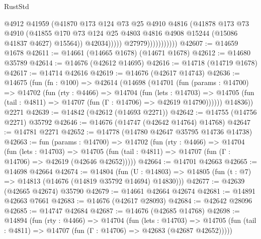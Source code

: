 \begin{lexlean}{RustStd}
\begin{coremodule}
                                  @4912
                                  @41959
                                  (@41870
                                    @173
                                    @124
                                    @73
                                    @25
                                    @4910
                                    @4816
                                    (@41878
                                      @173
                                      @73
                                      @4910
                                      (@41855
                                        @170
                                        @73
                                        @124
                                        @25
                                        @4803
                                        @4816
                                        @4908
                                        @15244
                                        (@15086 @41837 @4627)
                                        @15564))
                                    @42034)))))
                          @27979)))))))))))
@42607 := @14659 @1678
@42611 := @14661 (@14665 @1678) (@14671 @1678)
@42612 := @14680 @35789
@42614 := @14676 (@42612 @14695)
@42616 := @14718 (@14719 @1678)
@42617 := @14714 @42616
@42619 := @14676 (@42617 @14743)
@42636 := @14675
    (fun (fn : @100) =>
    @42614
      (@14698
        (@14701
          (fun (params : @14700) =>
          @14702
            (fun (rty : @4466) =>
            @14704
              (fun (lets : @14703) =>
              @14705 (fun (tail : @4811) => @14707 (fun (Γ : @14706) => @42619 @14790))))))
        @14836))
    @2271
@42639 := @14842 (@42612 (@14693 @2271))
@42642 := @14755 (@14756 @2271) @35792
@42646 := @14676 (@14747 (@42642 @14764) @14768)
@42647 := @14781 @2271
@42652 := @14778 (@14780 @42647 @35795 @14736 @14738)
@42663 := fun (params : @14700) =>
  @14702
    (fun (rty : @4466) =>
    @14704
      (fun (lets : @14703) =>
      @14705 (fun (tail : @4811) => @14707 (fun (Γ : @14706) => @42619 (@42646 @42652)))))
@42664 := @14701 @42663
@42665 := @14698 @42664
@42674 := @14804
    (fun (U : @14803) => @14805 (fun (t : @7) => @14813 (@14676 (@14819 @35792 @14694) @14830)))
@42677 := @42639 (@42665 @42674) @35790
@42679 := @14661 @42664 @42674
@42681 := @14891 @42663 @7661
@42683 := @14676 (@42617 @28093)
@42684 := @42642 @28096
@42685 := @14747 @42684
@42687 := @14676 (@42685 @14768)
@42698 := @14894
    (fun (rty : @4466) =>
    @14704
      (fun (lets : @14703) =>
      @14705 (fun (tail : @4811) => @14707 (fun (Γ : @14706) => @42683 (@42687 @42652)))))

\end{coremodule}
\end{lexlean}
